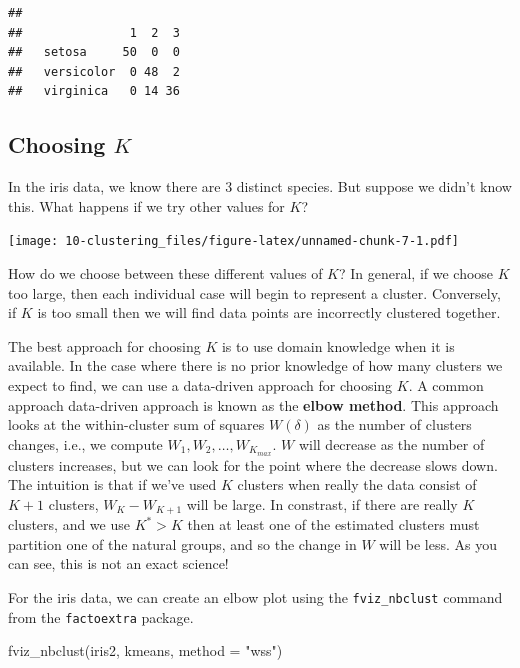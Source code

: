\documentclass[
]{book}
\newenvironment{Shaded}{\begin{snugshade}}{\end{snugshade}}
\newcommand{\AttributeTok}[1]{\textcolor[rgb]{0.77,0.63,0.00}{#1}}
\newcommand{\FunctionTok}[1]{\textcolor[rgb]{0.00,0.00,0.00}{#1}}
\newcommand{\NormalTok}[1]{#1}
\newcommand{\StringTok}[1]{\textcolor[rgb]{0.31,0.60,0.02}{#1}}
\theoremstyle{definition}
\theoremstyle{definition}
\theoremstyle{definition}
\theoremstyle{definition}
\theoremstyle{remark}
\begin{document}
\begin{verbatim}
##             
##               1  2  3
##   setosa     50  0  0
##   versicolor  0 48  2
##   virginica   0 14 36
\end{verbatim}

\hypertarget{choosing-k}{%
\subsection{\texorpdfstring{Choosing \(K\)}{Choosing K}}\label{choosing-k}}

In the iris data, we know there are 3 distinct species. But suppose we didn't know this. What happens if we try other values for \(K\)?

\texttt{[image: 10-clustering\_files/figure-latex/unnamed-chunk-7-1.pdf]}

How do we choose between these different values of \(K\)?
In general, if we choose \(K\) too large, then each individual case will begin to represent a cluster. Conversely, if \(K\) is too small then we will find data points are incorrectly clustered together.

The best approach for choosing \(K\) is to use domain knowledge when it is available. In the case where there is no prior knowledge of how many clusters we expect to find, we can use a data-driven approach for choosing \(K\).
A common approach data-driven approach is known as the \textbf{elbow method}. This approach looks at the within-cluster sum of squares \(W(\delta)\) as the number of clusters changes, i.e., we compute \(W_1, W_2, \ldots, W_{K_{max}}\). \(W\) will decrease as the number of clusters increases, but we can look for the point where the decrease slows down. The intuition is that if we've used \(K\) clusters when really the data consist of \(K+1\) clusters, \(W_K-W_{K+1}\) will be large. In constrast, if there are really \(K\) clusters, and we use \(K^*>K\) then at least one of the estimated clusters must partition one of the natural groups, and so the change in \(W\) will be less. As you can see, this is not an exact science!

For the iris data, we can create an elbow plot using the \texttt{fviz\_nbclust} command from the \texttt{factoextra} package.

\begin{Shaded}
\begin{Highlighting}[]
\FunctionTok{fviz\_nbclust}\NormalTok{(iris2, kmeans, }\AttributeTok{method =} \StringTok{"wss"}\NormalTok{)}
\end{Highlighting}
\end{Shaded}
\end{document}

